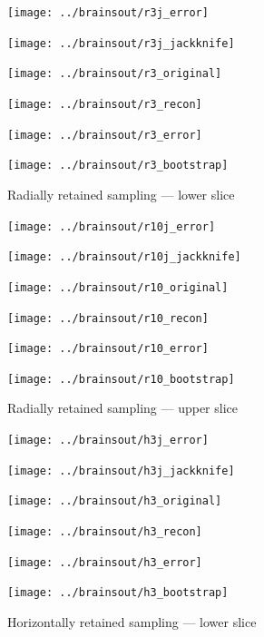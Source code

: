 \documentclass[article]{jdssv}
\begin{document}
\newlength{\vertsep}
\setlength{\vertsep}{.0in}
\newlength{\imsize}
\setlength{\imsize}{.34\textwidth}
\newlength{\imsizes}
\setlength{\imsizes}{.49\textwidth}


\begin{figure}
\begin{centering}

\parbox{\imsize}{\texttt{[image: ../brainsout/r3j\_error]}}
\parbox{\imsize}{\texttt{[image: ../brainsout/r3j\_jackknife]}}

\vspace{\vertsep}

\parbox{\imsize}{\texttt{[image: ../brainsout/r3\_original]}}
\parbox{\imsize}{\texttt{[image: ../brainsout/r3\_recon]}}

\vspace{\vertsep}

\parbox{\imsize}{\texttt{[image: ../brainsout/r3\_error]}}
\parbox{\imsize}{\texttt{[image: ../brainsout/r3\_bootstrap]}}

\end{centering}
\caption{Radially retained sampling --- lower slice}
\label{bigradial}
\end{figure}


\begin{figure}
\begin{centering}

\parbox{\imsize}{\texttt{[image: ../brainsout/r10j\_error]}}
\parbox{\imsize}{\texttt{[image: ../brainsout/r10j\_jackknife]}}

\vspace{\vertsep}

\parbox{\imsize}{\texttt{[image: ../brainsout/r10\_original]}}
\parbox{\imsize}{\texttt{[image: ../brainsout/r10\_recon]}}

\vspace{\vertsep}

\parbox{\imsize}{\texttt{[image: ../brainsout/r10\_error]}}
\parbox{\imsize}{\texttt{[image: ../brainsout/r10\_bootstrap]}}

\end{centering}
\caption{Radially retained sampling --- upper slice}
\end{figure}


\begin{figure}
\begin{centering}

\parbox{\imsize}{\texttt{[image: ../brainsout/h3j\_error]}}
\parbox{\imsize}{\texttt{[image: ../brainsout/h3j\_jackknife]}}

\vspace{\vertsep}

\parbox{\imsize}{\texttt{[image: ../brainsout/h3\_original]}}
\parbox{\imsize}{\texttt{[image: ../brainsout/h3\_recon]}}

\vspace{\vertsep}

\parbox{\imsize}{\texttt{[image: ../brainsout/h3\_error]}}
\parbox{\imsize}{\texttt{[image: ../brainsout/h3\_bootstrap]}}

\end{centering}
\caption{Horizontally retained sampling --- lower slice}
\end{figure}
\end{document}
